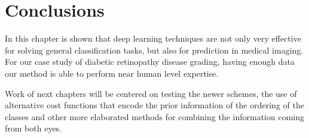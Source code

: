 \section{Conclusions}

In this chapter is shown that deep learning techniques are not only very effective for solving general classification tasks, but also for prediction in medical imaging. For our case study of diabetic retinopathy disease grading, having enough data our method is able to perform near human level expertise.

Work of next chapters will be centered on testing the newer schemes, the use of alternative cost functions that encode the prior information of the ordering of the classes and other more elaborated methods for combining the information coming from both eyes.
